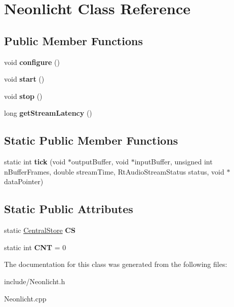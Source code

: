 \hypertarget{classNeonlicht}{}\section{Neonlicht Class Reference}
\label{classNeonlicht}
\subsection*{Public Member Functions}
\begin{DoxyCompactItemize}
\item 
void {\bfseries configure} ()\hypertarget{classNeonlicht_a32ec4c221148d01bbafd1637ced9b130}{}\label{classNeonlicht_a32ec4c221148d01bbafd1637ced9b130}

\item 
void {\bfseries start} ()\hypertarget{classNeonlicht_aae54e46be4d251ce4e062cd777994a69}{}\label{classNeonlicht_aae54e46be4d251ce4e062cd777994a69}

\item 
void {\bfseries stop} ()\hypertarget{classNeonlicht_a9d1f643b1a2394f9cd181149f7558c72}{}\label{classNeonlicht_a9d1f643b1a2394f9cd181149f7558c72}

\item 
long {\bfseries get\+Stream\+Latency} ()\hypertarget{classNeonlicht_a4354cc2fa6d7bd22e89d1314e375f54f}{}\label{classNeonlicht_a4354cc2fa6d7bd22e89d1314e375f54f}

\end{DoxyCompactItemize}
\subsection*{Static Public Member Functions}
\begin{DoxyCompactItemize}
\item 
static int {\bfseries tick} (void $\ast$output\+Buffer, void $\ast$input\+Buffer, unsigned int n\+Buffer\+Frames, double stream\+Time, Rt\+Audio\+Stream\+Status status, void $\ast$data\+Pointer)\hypertarget{classNeonlicht_a57c3e8d4154418c9efc4b48d45b732d6}{}\label{classNeonlicht_a57c3e8d4154418c9efc4b48d45b732d6}

\end{DoxyCompactItemize}
\subsection*{Static Public Attributes}
\begin{DoxyCompactItemize}
\item 
static \hyperlink{classCentralStore}{Central\+Store} {\bfseries CS}\hypertarget{classNeonlicht_a1ac3a31190125df3763a9f3d2f085d5e}{}\label{classNeonlicht_a1ac3a31190125df3763a9f3d2f085d5e}

\item 
static int {\bfseries C\+NT} = 0\hypertarget{classNeonlicht_ac86fbdabd4683feaac58b4aefbdf6695}{}\label{classNeonlicht_ac86fbdabd4683feaac58b4aefbdf6695}

\end{DoxyCompactItemize}


The documentation for this class was generated from the following files\+:\begin{DoxyCompactItemize}
\item 
include/Neonlicht.\+h\item 
Neonlicht.\+cpp\end{DoxyCompactItemize}
